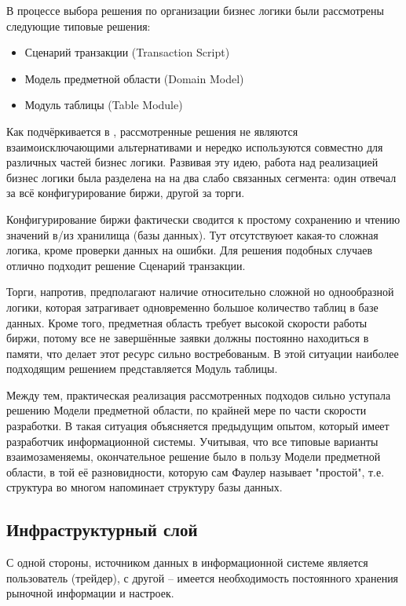\documentclass[a4paper, 12pt]{article}        %
\begin{document}
В процессе выбора решения по организации бизнес логики были рассмотрены следующие типовые решения:
\begin{itemize}
\item Сценарий транзакции (Transaction Script)
\item Модель предметной области (Domain Model)
\item Модуль таблицы (Table Module)
\end{itemize}

Как подчёркивается в \cite{m1}, рассмотренные решения не являются взаимоисключающими альтернативами и нередко используются совместно для различных частей бизнес логики. Развивая эту идею, работа над реализацией бизнес логики была разделена на на два слабо связанных сегмента: один отвечал за всё конфигурирование биржи, другой за торги.

Конфигурирование биржи фактически сводится к простому сохранению и чтению значений в/из хранилища (базы данных). Тут отсутствуюет какая-то сложная логика, кроме проверки данных на ошибки. Для решения подобных случаев отлично подходит решение Сценарий транзакции.

Торги, напротив, предполагают наличие относительно сложной но однообразной логики, которая затрагивает одновременно большое количество таблиц в базе данных. Кроме того, предметная область требует высокой скорости работы биржи, потому все не завершённые заявки должны постоянно находиться в памяти, что делает этот ресурс сильно востребованым. В этой ситуации наиболее подходящим решением представляется Модуль таблицы.

Между тем, практическая реализация рассмотренных подходов сильно уступала решению Модели предметной области, по крайней мере по части скорости разработки. В \cite{m1} такая ситуация объясняется предыдущим опытом, который имеет разработчик информационной системы. Учитывая, что все типовые варианты взаимозаменяемы, окончательное решение было в пользу Модели предметной области, в той её разновидности, которую сам Фаулер называет "простой", т.е. структура во многом напоминает структуру базы данных.

\subsection{Инфраструктурный слой}

С одной стороны, источником данных в информационной системе является пользователь (трейдер), с другой -- имеется необходимость постоянного хранения рыночной информации и настроек.
\end{document}
